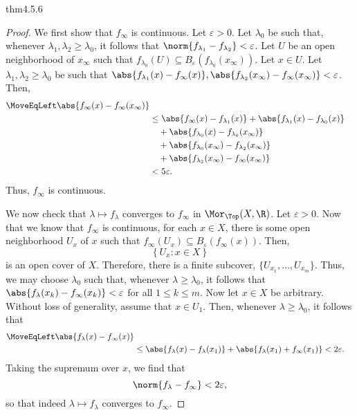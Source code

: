 \begin{thm}{}{thm4.5.6}
\begin{proof}
We first show that $f_\infty$ is continuous.  Let $\varepsilon >0$.  Let $\lambda _0$ be such that, whenever $\lambda _1,\lambda _2\geq \lambda _0$, it follows that $\norm{f_{\lambda _1}-f_{\lambda _2}}<\varepsilon$.  Let $U$ be an open neighborhood of $x_\infty$ such that $f_{\lambda _0}(U)\subseteq B_{\varepsilon}(f_{\lambda _0}(x_\infty ))$.  Let $x\in U$.  Let $\lambda _1,\lambda _2\geq \lambda _0$ be such that $\abs{f_{\lambda _1}(x)-f_\infty (x)},\abs{f_{\lambda _2}(x_\infty )-f_\infty (x_\infty )}<\varepsilon$.  Then,
\begin{equation}
\begin{split}
\MoveEqLeft
\abs{f_\infty (x)-f_\infty (x_\infty )} \\
& \leq \abs{f_\infty (x)-f_{\lambda _1}(x)}+\abs{f_{\lambda _1}(x)-f_{\lambda _0}(x)} \\ & \quad +\abs{f_{\lambda _0}(x)-f_{\lambda _0}(x_\infty )} \\ & \quad +\abs{f_{\lambda _0}(x_\infty )-f_{\lambda _2}(x_\infty )} \\ & \quad +\abs{f_{\lambda _2}(x_\infty )-f_\infty (x_\infty )} \\
& <5\varepsilon .
\end{split}
\end{equation}
Thus, $f_\infty$ is continuous.

We now check that $\lambda \mapsto f_\lambda$ converges to $f_\infty$ in $\Mor _{\Top}(X,\R )$.  Let $\varepsilon >0$.  Now that we know that $f_\infty$ is continuous, for each $x\in X$, there is some open neighborhood $U_x$ of $x$ such that $f_\infty (U_x)\subseteq B_{\varepsilon}(f_\infty (x))$.  Then, 
\begin{equation}
\left\{ U_x:x\in X\right\} 
\end{equation}
is an open cover of $X$.  Therefore, there is a finite subcover, $\{U_{x_1},\ldots ,U_{x_m}\}$.  Thus, we may choose $\lambda _0$ such that, whenever $\lambda \geq \lambda _0$, it follows that $\abs{f_\lambda (x_k)-f_\infty (x_k)}<\varepsilon$ for all $1\leq k\leq m$.  Now let $x\in X$ be arbitrary.  Without loss of generality, assume that $x\in U_1$.  Then, whenever $\lambda \geq \lambda _0$, it follows that
\begin{equation}
\begin{split}
\MoveEqLeft
\abs{f_\lambda (x)-f_\infty (x)} \\
& \leq \abs{f_\lambda (x)-f_\lambda (x_1)}+\abs{f_\lambda (x_1)+f_\infty (x_1)}<2\varepsilon .
\end{split}
\end{equation}
Taking the supremum over $x$, we find that
\begin{equation}
\norm{f_\lambda -f_\infty }<2\varepsilon ,
\end{equation}
so that indeed $\lambda \mapsto f_\lambda$ converges to $f_\infty$.


\end{proof}
\end{thm}
